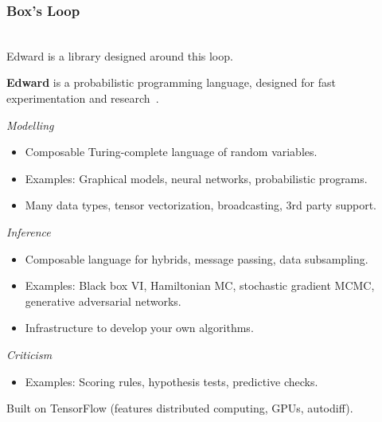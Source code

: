 \documentclass[10pt]{beamer}
\begin{document}
\begin{frame}
\frametitle{Box's Loop}
\center
{} \\
\vspace{20pt}
Edward is a library designed around this loop. \\
\citep{box_science_1976-1,box_sampling_1980-1}
\end{frame}


\begin{frame}
\vspace{3ex}
\textbf{Edward} is a probabilistic programming language,
designed for fast experimentation and research~\citep{tran_deep_2017}.

\emph{Modelling}
\begin{itemize}
\item Composable Turing-complete language of random variables.
\item Examples: Graphical models, neural networks, probabilistic programs.
\item Many data types, tensor vectorization, broadcasting, 3rd party support.
\end{itemize}

\emph{Inference}
\begin{itemize}
\item Composable language for hybrids, message passing, data subsampling.
\item Examples: Black box VI, Hamiltonian MC, stochastic gradient MCMC,
  generative adversarial networks.
\item Infrastructure to develop your own algorithms.
\end{itemize}

\emph{Criticism}
\begin{itemize}
\item Examples: Scoring rules, hypothesis tests, predictive checks.
\end{itemize}

\vspace{1ex}
Built on TensorFlow (features distributed computing, GPUs, autodiff).
\end{frame}

\begin{frame}[fragile]
\inputminted{python}{beta-bernoulli.py}
\end{frame}
\end{document}
